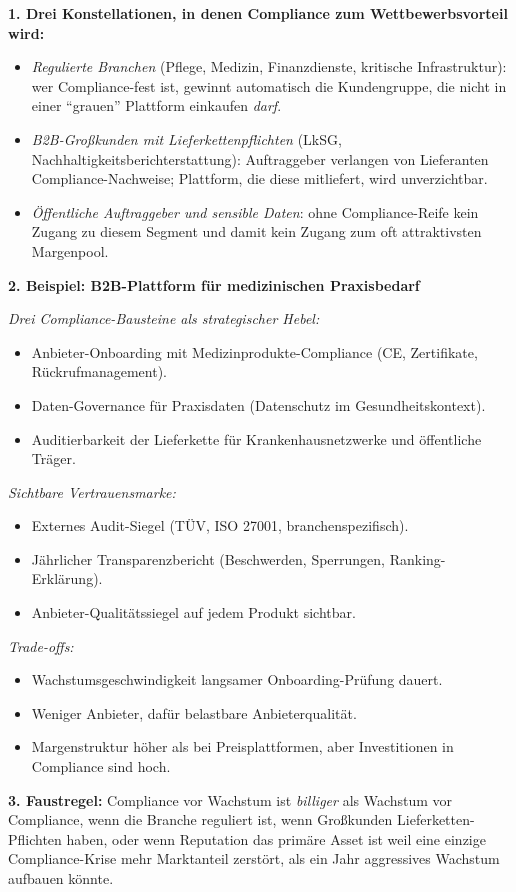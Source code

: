 \documentclass[11pt,a4paper,oneside]{article}
\begin{document}
\begin{loesungbox}
\textbf{1. Drei Konstellationen, in denen Compliance zum Wettbewerbsvorteil wird:}
\begin{itemize}
  \item \emph{Regulierte Branchen} (Pflege, Medizin, Finanzdienste, kritische Infrastruktur): wer Compliance-fest ist, gewinnt automatisch die Kundengruppe, die nicht in einer ``grauen'' Plattform einkaufen \emph{darf}.
  \item \emph{B2B-Großkunden mit Lieferkettenpflichten} (LkSG, Nachhaltigkeitsberichterstattung): Auftraggeber verlangen von Lieferanten Compliance-Nachweise; Plattform, die diese mitliefert, wird unverzichtbar.
  \item \emph{Öffentliche Auftraggeber und sensible Daten}: ohne Compliance-Reife kein Zugang zu diesem Segment \textendash{} und damit kein Zugang zum oft attraktivsten Margenpool.
\end{itemize}

\smallskip
\textbf{2. Beispiel: B2B-Plattform für medizinischen Praxisbedarf}

\smallskip
\emph{Drei Compliance-Bausteine als strategischer Hebel:}
\begin{itemize}
  \item Anbieter-Onboarding mit Medizinprodukte-Compliance (CE, Zertifikate, Rückrufmanagement).
  \item Daten-Governance für Praxisdaten (Datenschutz im Gesundheitskontext).
  \item Auditierbarkeit der Lieferkette für Krankenhausnetzwerke und öffentliche Träger.
\end{itemize}

\emph{Sichtbare Vertrauensmarke:}
\begin{itemize}
  \item Externes Audit-Siegel (TÜV, ISO 27001, branchenspezifisch).
  \item Jährlicher Transparenzbericht (Beschwerden, Sperrungen, Ranking-Erklärung).
  \item Anbieter-Qualitätssiegel auf jedem Produkt sichtbar.
\end{itemize}

\emph{Trade-offs:}
\begin{itemize}
  \item Wachstumsgeschwindigkeit langsamer \textendash{} Onboarding-Prüfung dauert.
  \item Weniger Anbieter, dafür belastbare Anbieterqualität.
  \item Margenstruktur höher als bei Preisplattformen, aber Investitionen in Compliance sind hoch.
\end{itemize}

\textbf{3. Faustregel:}
Compliance vor Wachstum ist \emph{billiger} als Wachstum vor Compliance, wenn die Branche reguliert ist, wenn Großkunden Lieferketten-Pflichten haben, oder wenn Reputation das primäre Asset ist \textendash{} weil eine einzige Compliance-Krise mehr Marktanteil zerstört, als ein Jahr aggressives Wachstum aufbauen könnte.
\end{loesungbox}
\end{document}
